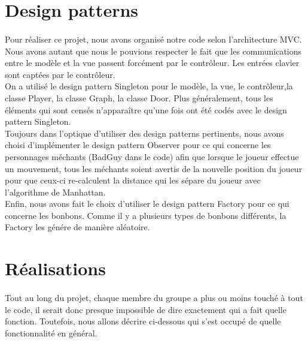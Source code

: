 \documentclass{article}
\begin{document}
  \section{Design patterns}
  \paragraph{}
  Pour réaliser ce projet, nous avons organisé notre code selon l'architecture
  MVC. Nous avons autant que nous le pouvions respecter le fait que les
  communications entre le modèle et la vue passent forcément par le contrôleur.
  Les entrées clavier sont captées par le contrôleur.\\
  On a utilisé le design pattern Singleton pour le modèle, la vue, le
  contrôleur,la classe Player, la classe Graph, la classe Door. Plus
  généralement, tous les éléments qui sont censés n'apparaître qu'une fois ont
  été codés avec le design pattern Singleton.\\
  Toujours dans l'optique d'utiliser des design patterns pertinents, nous avons
  choisi d'implémenter le design pattern Observer pour ce qui concerne les
  personnages méchants (BadGuy dans le code) afin que lorsque le joueur effectue
  un mouvement, tous les méchants soient avertis de la nouvelle position du
  joueur pour que ceux-ci re-calculent la distance qui les sépare du joueur avec
  l'algorithme de Manhattan.\\
  Enfin, nous avons fait le choix d'utiliser le design pattern Factory pour ce
  qui concerne les bonbons. Comme il y a plusieurs types de bonbons différents,
  la Factory les génére de manière aléatoire.

  \section{Réalisations}
  \paragraph{}
  Tout au long du projet, chaque membre du groupe a plus ou moins touché à tout
  le code, il serait donc presque impossible de dire exactement qui a fait
  quelle fonction. Toutefois, nous allons décrire ci-dessous qui s'est occupé
  de quelle fonctionnalité en général.
\end{document}
